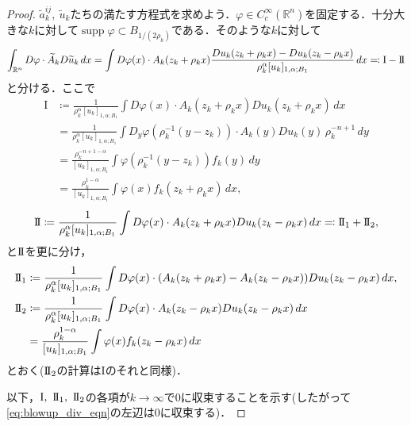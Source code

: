 \documentclass[a4paper]{ltjsarticle}
\newcommand{\Rset}{\mathbb{R}}
\newcommand{\one}{\mathrm{I}}
\newcommand{\two}{\mathrm{I}\hspace{-1.2pt}\mathrm{I}}
\newcommand{\1}{\mathbbm{1}}
\DeclareMathOperator{\supp}{\mathrm{supp}}
\numberwithin{equation}{section}
\theoremstyle{definition}
\begin{document}
\begin{proof}
    $\widetilde{a}^{ij}_k,\ \widetilde{u}_k$たちの満たす方程式を求めよう．$\varphi\in C_c^{\infty}(\Rset^n)$を固定する．十分大きな$k$に対して$\supp\varphi\subset B_{1/(2\rho_k)}$である．そのような$k$に対して
    \begin{equation}
        \int_{\Rset^n}D\varphi\cdot \widetilde{A}_kD\widetilde{u}_k\,dx=\int D\varphi(x)\cdot A_k(z_k+\rho_kx)\frac{Du_k(z_k+\rho_kx)-Du_k(z_k-\rho_kx)}{\rho_k^\alpha[u_k]_{1,\alpha;B_1}}\,dx\eqqcolon \one-\two\label{eq:blowup_div_eqn}
    \end{equation}
    と分ける．ここで
    \begin{align}
        \one&\coloneqq \frac{1}{\rho_k^\alpha [u_k]_{1,\alpha;B_1}}\int D\varphi(x)\cdot A_k(z_k+\rho_kx)Du_k(z_k+\rho_kx)\,dx\\
        &=\frac{1}{\rho_k^\alpha[u_k]_{1,\alpha;B_1}}\int D_y \varphi(\rho_k^{-1}(y-z_k))\cdot A_k(y)Du_k(y)\,\rho_k^{-n+1}\,dy\\
        &=\frac{\rho_k^{-n+1-\alpha}}{[u_k]_{1,\alpha;B_1}}\int \varphi(\rho_k^{-1}(y-z_k))f_k(y)\,dy \\
        &=\frac{\rho_k^{1-\alpha}}{[u_k]_{1,\alpha;B_1}}\int \varphi(x)f_k(z_k+\rho_kx)\,dx ,
    \end{align}
    \begin{equation}
        \two\coloneqq \frac{1}{\rho_k^\alpha[u_k]_{1,\alpha;B_1}}\int D\varphi(x)\cdot A_k(z_k+\rho_kx)Du_k(z_k-\rho_kx)\,dx\eqqcolon \two_1+\two_2,
    \end{equation}
    と$\two$を更に分け，
    \begin{align}
        \two_1&\coloneqq \frac{1}{\rho_k^\alpha[u_k]_{1,\alpha;B_1}}\int D\varphi(x)\cdot \qty(A_k(z_k+\rho_kx)-A_k(z_k-\rho_kx))Du_k(z_k-\rho_kx)\,dx,\\
        \two_2&\coloneqq \frac{1}{\rho_k^\alpha[u_k]_{1,\alpha;B_1}}\int D\varphi(x)\cdot A_k(z_k-\rho_kx)Du_k(z_k-\rho_kx)\,dx\\
        &=\frac{\rho_k^{1-\alpha}}{[u_k]_{1,\alpha;B_1}}\int \varphi(x)f_k(z_k-\rho_kx)\,dx 
    \end{align}
    とおく($\two_2$の計算は$\one$のそれと同様)．

    以下，$\one,\ \two_1,\ \two_2$の各項が$k\to\infty$で0に収束することを示す(したがって\eqref{eq:blowup_div_eqn}の左辺は0に収束する)．


\end{proof}
\end{document}
